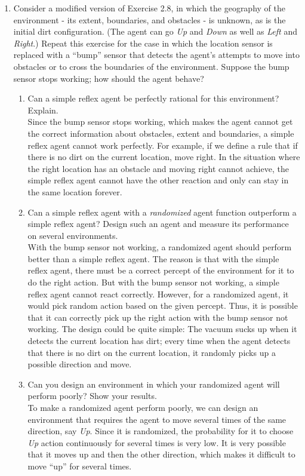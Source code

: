 \documentclass{article}%
\begin{document}
\begin{enumerate}
\begin{enumerate}
	\item Consider a modified version of Exercise 2.8, in which the geography of the environment - its extent, boundaries, and obstacles - is unknown, as is the initial dirt configuration. (The agent can go \textit{Up} and \textit{Down} as well as \textit{Left} and \textit{Right}.) Repeat this exercise for the case in which the location sensor is replaced with a ``bump'' sensor that detects the agent's attempts to move into obstacles or to cross the boundaries of the environment. Suppose the bump sensor stops working; how should the agent behave? 
	\begin{enumerate}
	\item Can a simple reflex agent be perfectly rational for this environment? Explain.\\
	Since the bump sensor stops working, which makes the agent cannot get the correct information about obstacles, extent and boundaries, a simple reflex agent cannot work perfectly. For example, if we define a rule that if there is no dirt on the current location, move right. In the situation where the right location has an obstacle and moving right cannot achieve, the simple reflex agent cannot have the other reaction and only can stay in the same location forever. 
	
	\item Can a simple reflex agent with a \textit{randomized} agent function outperform a simple reflex agent? Design such an agent and measure its performance on several environments.\\
	With the bump sensor not working, a randomized agent should perform better than a simple reflex agent. The reason is that with the simple reflex agent, there must be a correct percept of the environment for it to do the right action. But with the bump sensor not working, a simple reflex agent cannot react correctly. However, for a randomized agent, it would pick random action based on the given percept. Thus, it is possible that it can correctly pick up the right action with the bump sensor not working. The design could be quite simple: The vacuum sucks up when it detects the current location has dirt; every time when the agent detects that there is no dirt on the current location, it randomly picks up a possible direction and move. 
	
	\item Can you design an environment in which your randomized agent will perform poorly? Show your results. \\
	To make a randomized agent perform poorly, we can design an environment that requires the agent to move several times of the same direction, say \textit{Up}. Since it is randomized, the probability for it to choose \textit{Up} action continuously for several times is very low. It is very possible that it moves up and then the other direction, which makes it difficult to move ``up'' for several times.
	

\end{enumerate}
\end{enumerate}
\end{enumerate}
\end{document}
